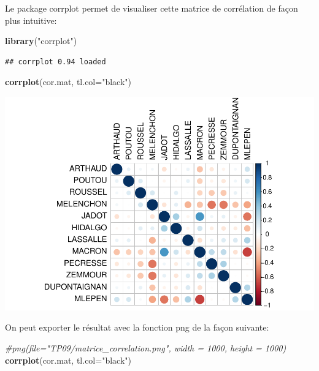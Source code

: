 \documentclass[
]{book}
\newenvironment{Shaded}{\begin{snugshade}}{\end{snugshade}}
\newcommand{\AttributeTok}[1]{\textcolor[rgb]{0.13,0.29,0.53}{#1}}
\newcommand{\CommentTok}[1]{\textcolor[rgb]{0.56,0.35,0.01}{\textit{#1}}}
\newcommand{\FunctionTok}[1]{\textcolor[rgb]{0.13,0.29,0.53}{\textbf{#1}}}
\newcommand{\NormalTok}[1]{#1}
\newcommand{\StringTok}[1]{\textcolor[rgb]{0.31,0.60,0.02}{#1}}
\begin{document}
Le package corrplot permet de visualiser cette matrice de corrélation de façon plus intuitive:

\begin{Shaded}
\begin{Highlighting}[]
\FunctionTok{library}\NormalTok{(}\StringTok{"corrplot"}\NormalTok{)}
\end{Highlighting}
\end{Shaded}

\begin{verbatim}
## corrplot 0.94 loaded
\end{verbatim}

\begin{Shaded}
\begin{Highlighting}[]
\FunctionTok{corrplot}\NormalTok{(cor.mat, }\AttributeTok{tl.col=}\StringTok{"black"}\NormalTok{)}
\end{Highlighting}
\end{Shaded}

\includegraphics{manuel_geo_quanti_files/figure-latex/unnamed-chunk-54-1.pdf}

On peut exporter le résultat avec la fonction png de la façon suivante:

\begin{Shaded}
\begin{Highlighting}[]
\CommentTok{\#png(file="TP09/matrice\_correlation.png", width = 1000, height = 1000)}
\FunctionTok{corrplot}\NormalTok{(cor.mat, }\AttributeTok{tl.col=}\StringTok{"black"}\NormalTok{)}
\end{Highlighting}
\end{Shaded}
\end{document}
